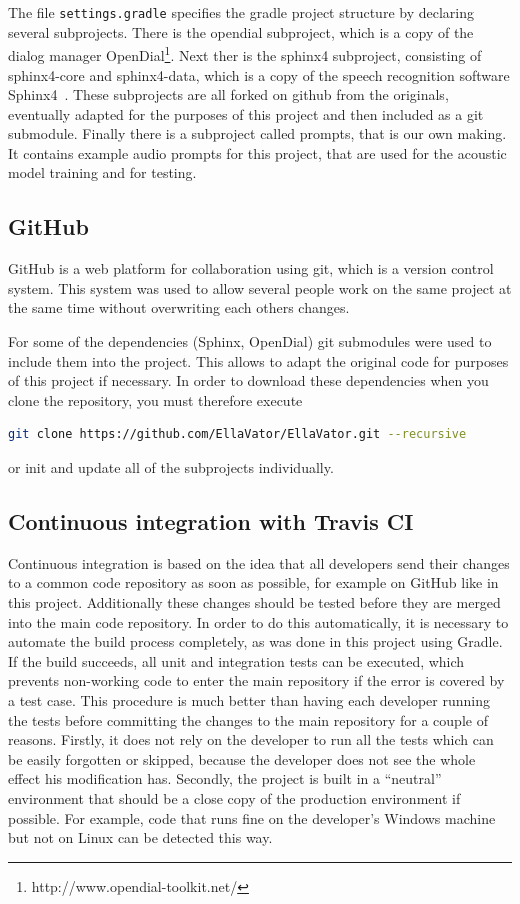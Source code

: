 \documentclass[a4paper, 12pt]{article}
\begin{document}
The file \texttt{settings.gradle} specifies the gradle project structure by declaring several subprojects.
There is the opendial subproject, which is a copy of the dialog manager OpenDial\footnote{http://www.opendial-toolkit.net/}.
Next ther is the sphinx4 subproject, consisting of sphinx4-core and sphinx4-data, which is a copy of the speech recognition software Sphinx4~\cite{Walker:2004:SFO:1698193}.
These subprojects are all forked on github from the originals, eventually adapted for the purposes of this project and then included as a git submodule.
Finally there is a subproject called prompts, that is our own making.
It contains example audio prompts for this project, that are used for the acoustic model training and for testing.

\subsection{GitHub}
GitHub is a web platform for collaboration using git, which is a version control system.
This system was used to allow several people work on the same project at the same time without overwriting each others changes.

For some of the dependencies (Sphinx, OpenDial) git submodules were used to include them into the project.
This allows to adapt the original code for purposes of this project if necessary.
In order to download these dependencies when you clone the repository, you must therefore execute
\begin{lstlisting}[language=bash]
git clone https://github.com/EllaVator/EllaVator.git --recursive
\end{lstlisting}
or init and update all of the subprojects individually.
\subsection{Continuous integration with Travis CI}

Continuous integration is based on the idea that all developers send their changes to a common code repository as soon as possible, for example on GitHub like in this project.
Additionally these changes should be tested before they are merged into the main code repository.
In order to do this automatically, it is necessary to automate the build process completely, as was done in this project  using Gradle.
If the build succeeds, all unit and integration tests can be executed, which prevents non-working code to enter the main repository if the error is covered by a test case.
This procedure is much better than having each developer running the tests before committing the changes to the main repository for a couple of reasons.
Firstly, it does not rely on the developer to run all the tests which can be easily forgotten or skipped, because the developer does not see the whole effect his modification has.
Secondly, the project is built in a “neutral” environment that should be a close copy of the production environment if possible.
For example, code that runs fine on the developer's Windows machine but not on Linux can be detected this way.
\end{document}
